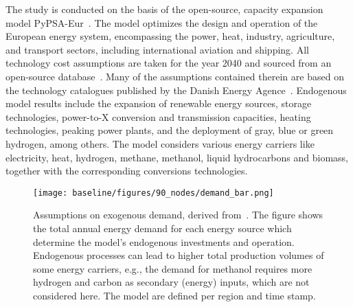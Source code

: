 \documentclass[twocolumn]{article}
\newcommand{\COtwo}{CO$_2$}
\begin{document}
The study is conducted on the basis of the open-source, capacity expansion model PyPSA-Eur~\cite{horschPyPSAEurOpenOptimisation2018,brownSynergiesSectorCoupling2018,PyPSAEurSecSectorCoupledOpen2023}.
The model optimizes the design and operation of the European energy system, encompassing the power, heat, industry, agriculture, and transport sectors, including international aviation and shipping.
All technology cost assumptions are taken for the year 2040 and sourced from an open-source database~\cite{lisazeyenPyPSATechnologydataTechnology2023}.
Many of the assumptions contained therein are based on the technology catalogues published by the Danish Energy Agence~\cite{TODO}.
Endogenous model results include the expansion of renewable energy sources, storage technologies, power-to-X conversion and transmission capacities, heating technologies, peaking power plants, and the deployment of gray, blue or green hydrogen, among others.
The model considers various energy carriers like electricity, heat, hydrogen, methane, methanol, liquid hydrocarbons and biomass, together with the corresponding conversions technologies.

\begin{figure}
    \texttt{[image: baseline/figures/90\_nodes/demand\_bar.png]}
    \caption{Assumptions on exogenous demand, derived from~\cite{piamanzGeoreferencedIndustrialSites2018,muehlenpfordtTimeSeries2019,mantzosJRCIDEES20152018,NationalEmissionsReported2023,EurostatCompleteEnergyBalance,uwekrienDemandlib2023}. The figure shows the total annual energy demand for each energy source which determine the model's endogenous investments and operation. Endogenous processes can lead to higher total production volumes of some energy carriers, e.g., the demand for methanol requires more hydrogen and carbon as secondary (energy) inputs, which are not considered here. The model are defined per region and time stamp.}
    \label{fig:total-demand-bar}
\end{figure}

\end{document}

